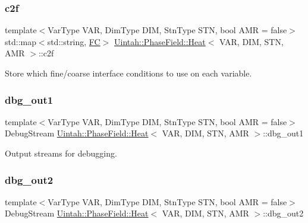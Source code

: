 \subsubsection{\texorpdfstring{c2f}{c2f}}
{\footnotesize\ttfamily template$<$Var\+Type V\+AR, Dim\+Type D\+IM, Stn\+Type S\+TN, bool A\+MR = false$>$ \\
std\+::map$<$std\+::string, \hyperlink{namespaceUintah_1_1PhaseField_aeb51fe956fe07f1487f5878f4039f27c}{FC}$>$ \hyperlink{classUintah_1_1PhaseField_1_1Heat}{Uintah\+::\+Phase\+Field\+::\+Heat}$<$ V\+AR, D\+IM, S\+TN, A\+MR $>$\+::c2f\hspace{0.3cm}{\ttfamily [protected]}}



Store which fine/coarse interface conditions to use on each variable. 

\mbox{\label{classUintah_1_1PhaseField_1_1Heat_a0e7faf909e7e82c7c0aff03d261a6fa9}} 
\subsubsection{\texorpdfstring{dbg\+\_\+out1}{dbg\_out1}}
{\footnotesize\ttfamily template$<$Var\+Type V\+AR, Dim\+Type D\+IM, Stn\+Type S\+TN, bool A\+MR = false$>$ \\
Debug\+Stream \hyperlink{classUintah_1_1PhaseField_1_1Heat}{Uintah\+::\+Phase\+Field\+::\+Heat}$<$ V\+AR, D\+IM, S\+TN, A\+MR $>$\+::dbg\+\_\+out1\hspace{0.3cm}{\ttfamily [protected]}}



Output streams for debugging. 

\mbox{\label{classUintah_1_1PhaseField_1_1Heat_af10b94a5699065313918cf8291b355f8}} 
\subsubsection{\texorpdfstring{dbg\+\_\+out2}{dbg\_out2}}
{\footnotesize\ttfamily template$<$Var\+Type V\+AR, Dim\+Type D\+IM, Stn\+Type S\+TN, bool A\+MR = false$>$ \\
Debug\+Stream \hyperlink{classUintah_1_1PhaseField_1_1Heat}{Uintah\+::\+Phase\+Field\+::\+Heat}$<$ V\+AR, D\+IM, S\+TN, A\+MR $>$\+::dbg\+\_\+out2\hspace{0.3cm}{\ttfamily [protected]}}


